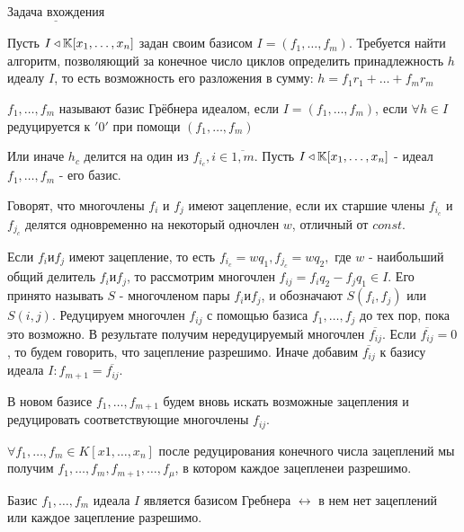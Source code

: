 $\underline{\text{Задача вхождения}}$ 

Пусть $I \triangleleft \mathbb{K}[x_1,\ldots,x_n]$ задан своим базисом $I = (f_1,\ldots,f_m)$. Требуется найти алгоритм, позволяющий за конечное число циклов определить принадлежность $h$ идеалу $I$, то есть возможность его разложения в сумму: $h = f_1r_1 + \ldots + f_mr_m$

\opr $f_1,\ldots,f_m$ называют базис Грёбнера идеалом, если $I = (f_1,\ldots,f_m)$, если $\forall h \in I$ редуцируется к $'0'$ при помощи $(f_1,\dots,f_m)$

Или иначе $h_c$ делится на один из $f_{i_c},i \in \overline{1,m}$. Пусть $I \triangleleft \mathbb{K}[x_1,\ldots,x_n]$ - идеал $f_1,\ldots,f_m $ - его базис.

\opr Говорят, что многочлены $f_i$ и $f_j$ имеют зацепление, если их старшие члены $f_{i_c}$ и $f_{j_c}$ делятся одновременно на некоторый одночлен $w$, отличный от $const$.

Если $f_i и f_j$ имеют зацепление, то есть $f_{i_c} = wq_1, f_{j_c} = wq_2,$ где $w$ - наибольший общий делитель $f_i и f_j$, то рассмотрим многочлен $f_{ij} = f_iq_2 - f_jq_1 \in I$. Его принято называть $S$ - многочленом пары $f_i и f_j$, и обозначают $S(f_i,f_j)$ или $S(i,j)$. Редуцируем многочлен $f_{ij}$ с помощью базиса $f_1,\ldots,f_j$ до тех пор, пока это возможно. В результате получим нередуцируемый многочлен $\overline{f_{ij}}$. Если $\overline{f_{ij}} = 0$, то будем говорить, что зацепление разрешимо. Иначе добавим $\overline{f_{ij}}$ к базису идеала $I: f_{m+1} = \overline{f_{ij}}$.

 В новом базисе $f_1,\ldots,f_{m+1}$ будем вновь искать возможные зацепления и редуцировать соответствующие многочлены $f_{ij}$.

\thr $\forall f_1,\ldots,f_m \in K[x1,\ldots,x_n]$ после редуцирования конечного числа зацеплений мы получим $f_1,\ldots,f_m,f_{m+1},\ldots,f_\mu$, в котором каждое зацепленеи разрешимо.

\thr Базис $f_1,\ldots,f_m$ идеала $I$ является базисом Гребнера $\leftrightarrow$ в нем нет зацеплений или каждое зацепление разрешимо.

